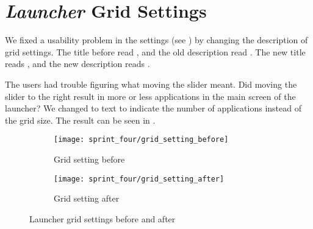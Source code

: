 
\section{\emph{Launcher} Grid Settings}
\label{sec:launcher_grid_setting}
We fixed a usability problem in the \launcher settings (see ) by changing the description of grid settings. The title before read , and the old description read . The new title reads , and the new description reads .

The users had trouble figuring what moving the slider meant. Did moving the slider to the right result in more or less applications in the main screen of the launcher? We changed to text to indicate the number of applications instead of the grid size. The result can be seen in . 

\begin{figure}[!htbp]
    \centering

    \begin{subfigure}[t]{0.75\textwidth}
        \texttt{[image: sprint\_four/grid\_setting\_before]}
        \caption{Grid setting before}
        \label{fig:launcher_grid_settings_old}
        \vspace*{1cm}
    \end{subfigure}
    \begin{subfigure}[t]{0.75\textwidth}
        \texttt{[image: sprint\_four/grid\_setting\_after]}
        \caption{Grid setting after}
        \label{fig:launcher_grid_settings_new}
    \end{subfigure}
    
    \caption{Launcher grid settings before and after}
    \label{fig:launcher_grid_settings}
\end{figure}